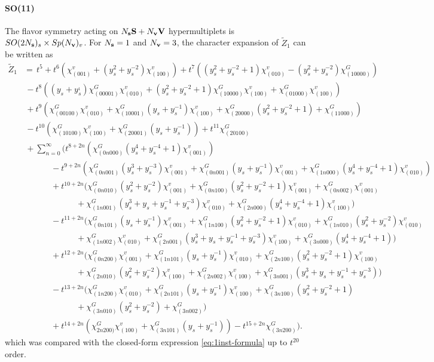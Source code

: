 \documentclass[letterpaper, 11pt]{article}
\newcommand{\nn}{\nonumber}
\begin{document}
{\paragraph{SO(11)} The flavor symmetry acting on $N_{\bf s} \mathbf{S} + N_{\bf v} \mathbf{V}$ hypermultiplets is $SO(2N_{\bf s})_s \times  Sp(N_{\bf v})_v$. For $N_{\bf s}=1$ and  $N_{\bf v} = 3$, the character expansion of  $\tilde{Z}_1$ can be written as
\begin{align}
  \label{eq:so11-s1v3}
\tilde{Z}_1&=\,t^5+t^6(\chi^v_{(001)}+(y_s^2+y_s^{-2})\chi^v_{(100)})+t^7((y_s^2+y_s^{-2}+1)\chi^v_{(010)}-(y_s^{2}+y_s^{-2})\chi^G_{(10000)})\nn\\
&\,-t^8((y_s+y_s^{_1})\chi^G_{(00001)}\chi^v_{(010)}+(y_s^2+y_s^{-2}+1)\chi^G_{(10000)}\chi^v_{(100)}+\chi^G_{(01000)}\chi^v_{(100)})\nn\\
&\,+t^9(\chi^G_{(00100)}\chi^v_{(010)}+\chi^G_{(10001)}(y_s+y_s^{-1})\chi^v_{(100)}+\chi^G_{(20000)}(y_s^2+y_s^{-2}+1)+\chi^G_{(11000)})\nn\\
&\,-t^{10}(\chi^G_{(10100)}\chi^v_{(100)}+\chi^G_{(20001)}(y_s+y_s^{-1}))+t^{11}\chi^G_{(20100)}\\
&\,+\sum_{n=0}^{\infty}\Big(t^{8+2n}(\chi^G_{(0n000)}(y_s^4+y_s^{-4}+1)\chi^v_{(001)})\nn\\
&\quad\qquad\ -t^{9+2n}(\chi^G_{(0n001)}(y_s^3+y_s^{-3})\chi^v_{(001)}+\chi^G_{(0n001)}(y_s+y_s^{-1})\chi^v_{(001)}+\chi^G_{(1n000)}(y_s^4+y_s^{-4}+1)\chi^v_{(010)})\nn\\
&\qquad\quad\ +t^{10+2n}(\chi^G_{(0n010)}(y_s^2+y_s^{-2})\chi^v_{(001)}+\chi^G_{(0n100)}(y_s^2+y_s^{-2}+1)\chi^v_{(001)}+\chi^G_{(0n002)}\chi^v_{(001)}\nn\\
&\qquad\qquad\qquad\ +\chi^G_{(1n001)}(y_s^3+y_s+y_s^{-1}+y_s^{-3})\chi^v_{(010)}+\chi^G_{(2n000)}(y_s^4+y_s^{-4}+1)\chi^v_{(100)})\nn\\
&\qquad\quad\ -t^{11+2n}(\chi^G_{(0n101)}(y_s+y_s^{-1})\chi^v_{(001)}+\chi^G_{(1n100)}(y_s^2+y_s^{-2}+1)\chi^v_{(010)}+\chi^G_{(1n010)}(y_s^2+y_s^{-2})\chi^v_{(010)}\nn\\
&\qquad\qquad\qquad\ +\chi^G_{(1n002)}\chi^v_{(010)}+\chi^G_{(2n001)}(y_s^3+y_s+y_s^{-1}+y_s^{-3})\chi^v_{(100)}+\chi^G_{(3n000)}(y_s^4+y_s^{-4}+1))\nn\\
&\qquad\quad\ +t^{12+2n}(\chi^G_{(0n200)}\chi^v_{(001)}+\chi^G_{(1n101)}(y_s+y_s^{-1})\chi^v_{(010)}+\chi^G_{(2n100)}(y_s^2+y_s^{-2}+1)\chi^v_{(100)}\nn\\
&\qquad\qquad\qquad\ +\chi^G_{(2n010)}(y_s^2+y_s^{-2})\chi^v_{(100)}+\chi^G_{(2n002)}\chi^v_{(100)}+\chi^G_{(3n001)}(y_s^3+y_s+y_s^{-1}+y_s^{-3}))\nn\\
&\qquad\quad\ -t^{13+2n}(\chi^G_{(1n200)}\chi^v_{(010)}+\chi^G_{(2n101)}(y_s+y_s^{-1})\chi^v_{(100)}+\chi^G_{(3n100)}(y_s^2+y_s^{-2}+1)\nn\\
&\qquad\qquad\qquad\ +\chi^G_{(3n010)}(y_s^2+y_s^{-2})+\chi^G_{(3n002)})\nn\\
&\qquad\quad\ +t^{14+2n}(\chi^G_{2n200)}\chi^v_{(100)}+\chi^G_{(3n101)}(y_s+y_s^{-1}))-t^{15+2n}\chi^G_{(3n200)}\Big). \nn
\end{align}
which was compared with the closed-form expression \eqref{eq:1inst-formula} up to $t^{20}$ order.

}
\end{document}
